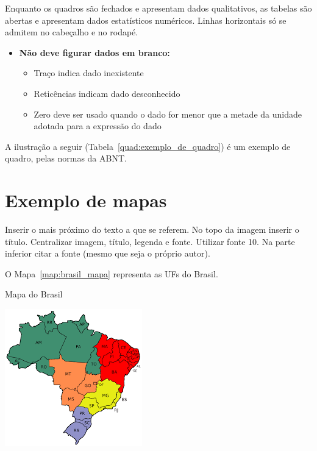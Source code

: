 \hrulefill

Enquanto os quadros são fechados e apresentam dados qualitativos,
as tabelas são abertas e apresentam dados estatísticos numéricos.
Linhas horizontais só se admitem no cabeçalho e no rodapé.
\begin{itemize}
    \item \textbf{Não deve figurar dados em branco:}
    \begin{itemize}
        \item Traço indica dado inexistente
        \item Reticências indicam dado desconhecido
        \item Zero deve ser usado quando o dado for menor que a metade da unidade adotada para a expressão do dado
    \end{itemize}
\end{itemize}

A ilustração a seguir (Tabela~\ref{quad:exemplo_de_quadro}) é um exemplo de quadro, pelas normas da ABNT.


\newpage
\section{Exemplo de mapas}
Inserir o mais próximo do texto a que se referem.
No topo da imagem inserir o título.
Centralizar imagem, título, legenda e fonte.
Utilizar fonte 10.
Na parte inferior citar a fonte (mesmo que seja o próprio autor).

O Mapa~\ref{map:brasil_mapa} representa as UFs do Brasil.

\begin{mapa}[H]
\centering
\caption{Mapa do Brasil}\label{map:brasil_mapa}
\includegraphics[scale=0.9]{material-de-apoio/mapas/mapa-do-brasil.png}\\
\end{mapa}

